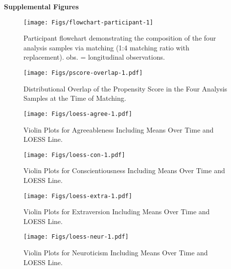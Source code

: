 \documentclass[
  english,
  man, noextraspace]{apa7}
\newenvironment{lltable}{\begin{landscape}\begin{center}\begin{ThreePartTable}}{\end{ThreePartTable}\end{center}\end{landscape}}
\begin{document}
\begin{appendix}
\begin{lltable}
{}

\end{lltable}

\noindent \textbf{Supplemental Figures}





\begin{figure}

{\centering \texttt{[image: Figs/flowchart-participant-1]} 

}

\caption{Participant flowchart demonstrating the
composition of the four analysis samples via matching (1:4 matching
ratio with replacement). obs. = longitudinal observations.}\label{fig:flowchart-participant}
\end{figure}




\begin{figure}
\centering
\texttt{[image: Figs/pscore-overlap-1.pdf]}
\caption{\label{fig:pscore-overlap}Distributional Overlap of the Propensity Score
in the Four Analysis Samples at the Time of Matching.}
\end{figure}




\begin{figure}
\centering
\texttt{[image: Figs/loess-agree-1.pdf]}
\caption{\label{fig:loess-agree}Violin Plots for Agreeableness Including Means
Over Time and LOESS Line.}
\end{figure}




\begin{figure}
\centering
\texttt{[image: Figs/loess-con-1.pdf]}
\caption{\label{fig:loess-con}Violin Plots for Conscientiousness Including Means
Over Time and LOESS Line.}
\end{figure}




\begin{figure}
\centering
\texttt{[image: Figs/loess-extra-1.pdf]}
\caption{\label{fig:loess-extra}Violin Plots for Extraversion Including Means Over
Time and LOESS Line.}
\end{figure}




\begin{figure}
\centering
\texttt{[image: Figs/loess-neur-1.pdf]}
\caption{\label{fig:loess-neur}Violin Plots for Neuroticism Including Means Over
Time and LOESS Line.}
\end{figure}





\end{appendix}
\end{document}
